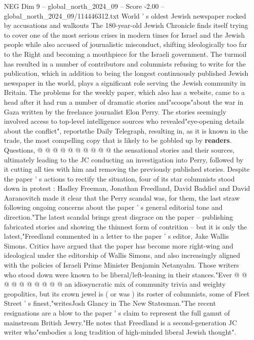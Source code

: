 \begin{textsample}{NEG Dim 9 – global\_north\_2024\_09 – Score -2.00 – global\_north\_2024\_09/114446312.txt}  \label{ex:f9_neg_213}
World ' s oldest Jewish newspaper rocked by accusations and walkouts The 180-year-old Jewish Chronicle finds itself trying to cover one of the most serious crises in modern times for Israel and the Jewish people while also accused of journalistic misconduct, shifting ideologically too far to the Right and becoming a mouthpiece for the Israeli government.
The turmoil has resulted in a number of contributors and columnists refusing to write for the publication, which in addition to being the longest continuously published Jewish newspaper in the world, plays a significant role serving the Jewish community in Britain.
The problems for the weekly paper, which also has a website, came to a head after it had run a number of dramatic stories and"scoops"about the war in Gaza written by the freelance journalist Elon Perry.
The stories seemingly involved access to top-level intelligence sources who revealed"eye-opening details about the conflict", reportsthe Daily Telegraph, resulting in, as it is known in the trade, the most compelling copy that is likely to be gobbled up by \textbf{readers}.
Questions, @ @ @ @ @ @ @ @ @ @ the sensational stories and their sources, ultimately leading to the JC conducting an investigation into Perry, followed by it cutting all ties with him and removing the previously published stories.
Despite the paper ' s actions to rectify the situation, four of its star columnists stood down in protest : Hadley Freeman, Jonathan Freedland, David Baddiel and David Aaranovitch made it clear that the Perry scandal was, for them, the last straw following ongoing concerns about the paper ' s general editorial tone and direction."The latest scandal brings great disgrace on the paper -- publishing fabricated stories and showing the thinnest form of contrition -- but it is only the latest,"Freedland commented in a letter to the paper ' s editor, Jake Wallis Simons.
Critics have argued that the paper has become more right-wing and ideological under the editorship of Wallis Simons, and also increasingly aligned with the policies of Israeli Prime Minister Benjamin Netanyahu.
Those writers who stood down were known to be liberal/left-leaning in their stances."Ever @ @ @ @ @ @ @ @ @ @ an idiosyncratic mix of community trivia and weighty geopolitics, but its crown jewel is ( or was ) its roster of columnists, some of Fleet Street ' s finest,"writesJosh Glancy in The New Statesman."The recent resignations are a blow to the paper ' s claim to represent the full gamut of mainstream British Jewry."He notes that Freedland is a second-generation JC writer who"embodies a long tradition of high-minded liberal Jewish thought".

\end{textsample}
